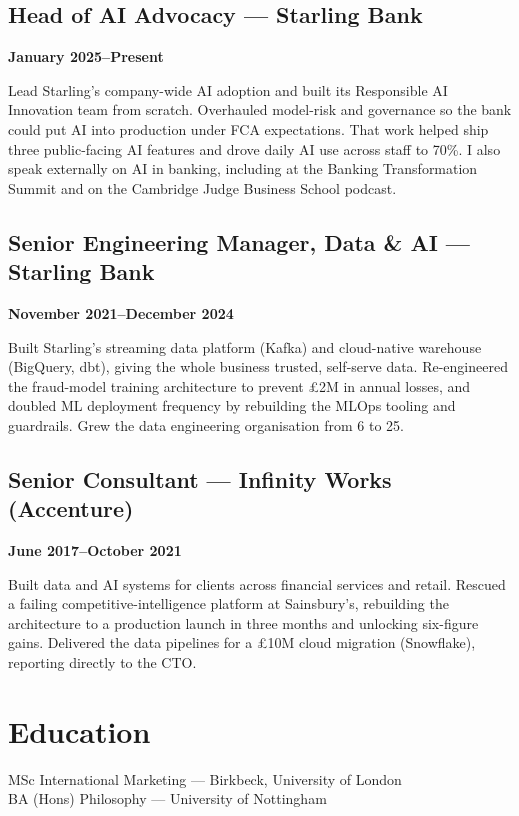 \documentclass[a4paper]{scrartcl}
\begin{document}
\subsection*{Head of AI Advocacy --- Starling Bank}
\textbf{January 2025--Present}

Lead Starling's company-wide AI adoption and built its Responsible AI Innovation team from scratch.
Overhauled model-risk and governance so the bank could put AI into production under FCA expectations. That
work helped ship three public-facing AI features and drove daily AI use across staff to 70\%. I
also speak externally on AI in banking, including at the Banking Transformation Summit and on the
Cambridge Judge Business School podcast.

\subsection*{Senior Engineering Manager, Data \& AI --- Starling Bank}
\textbf{November 2021--December 2024}

Built Starling's streaming data platform (Kafka) and cloud-native warehouse (BigQuery, dbt), giving the
whole business trusted, self-serve data. Re-engineered the fraud-model training architecture to prevent
£2M in annual losses, and doubled ML deployment frequency by rebuilding the MLOps tooling and guardrails.
Grew the data engineering organisation from 6 to 25.

\subsection*{Senior Consultant --- Infinity Works (Accenture)}
\textbf{June 2017--October 2021}

Built data and AI systems for clients across financial services and retail. Rescued a failing
competitive-intelligence platform at Sainsbury's, rebuilding the architecture to a production launch in
three months and unlocking six-figure gains. Delivered the data pipelines for a £10M cloud migration
(Snowflake), reporting directly to the CTO.

\section*{Education}
MSc International Marketing --- Birkbeck, University of London \\
BA (Hons) Philosophy --- University of Nottingham
\end{document}
